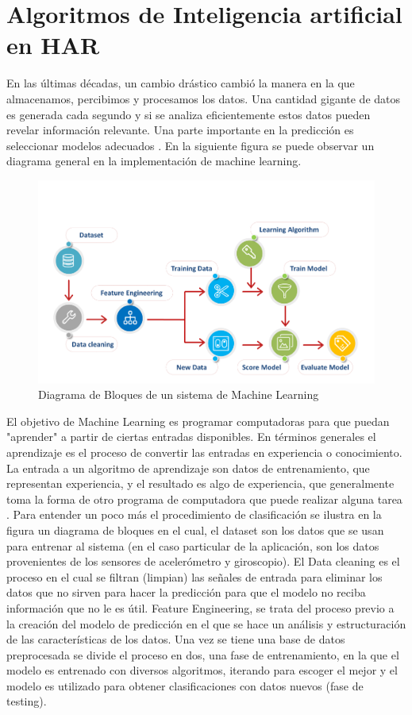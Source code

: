 \documentclass[11pt]{report}
\begin{document}
\section{Algoritmos de Inteligencia artificial en HAR}
En las últimas décadas, un cambio drástico cambió la manera en la que almacenamos, percibimos y procesamos los datos. Una cantidad gigante de datos es generada cada segundo y si se analiza eficientemente estos datos pueden revelar información relevante. Una parte importante en la predicción es seleccionar modelos adecuados \cite{ApplicationHAR}. En la siguiente figura se puede observar un diagrama general en la implementación de machine learning.
\begin{figure}[H]
  \centering
    \includegraphics[width=1\textwidth]{machinelearning}
   \caption{Diagrama de Bloques de un sistema de Machine Learning \cite{wowslides_2017}}
\end{figure}

El objetivo de Machine Learning es programar computadoras para que puedan "aprender" a partir de ciertas entradas disponibles. En términos generales el aprendizaje es el proceso de convertir las entradas en experiencia o conocimiento. La entrada a un algoritmo de aprendizaje son datos de entrenamiento, que representan experiencia, y el resultado es algo de experiencia, que generalmente toma la forma de otro programa de computadora que puede realizar alguna tarea \cite{shalev2014understanding}. Para entender un poco más el procedimiento de clasificación se ilustra en la figura un diagrama de bloques en el cual, el dataset son los datos que se usan para entrenar al sistema (en el caso particular de la aplicación, son los datos provenientes de los sensores de acelerómetro y giroscopio). El Data cleaning es el proceso en el cual se filtran (limpian) las señales de entrada para eliminar los datos que no sirven para hacer la predicción para que el modelo no reciba información que no le es útil. Feature Engineering, se trata del proceso previo a la creación del modelo de predicción en el que se hace un análisis y estructuración de las características de los datos. Una vez se tiene una base de datos preprocesada se divide el proceso en dos, una fase de entrenamiento, en la que el modelo es entrenado con diversos algoritmos, iterando para escoger el mejor y el modelo es utilizado para obtener clasificaciones con datos nuevos (fase de testing).
\end{document}
